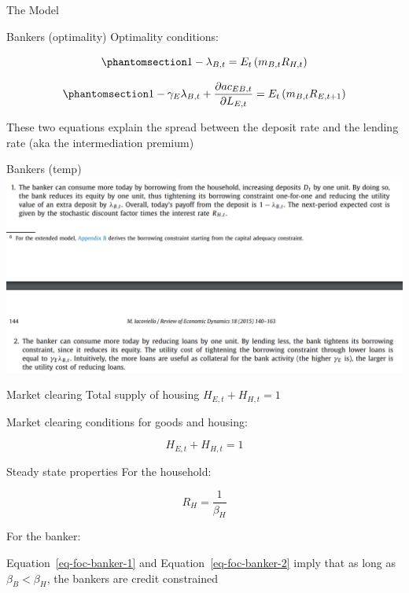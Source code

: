 \documentclass[
  ignorenonframetext,
]{beamer}
\begin{document}
\begin{frame}{The Model}
\begin{block}{Bankers (optimality)}
Optimality conditions:

\begin{equation}\phantomsection\label{eq-foc-banker-1}{1-\lambda_{B,t} = E_t \left( m_{B,t} R_{H,t} \right)}\end{equation}

\begin{equation}\phantomsection\label{eq-foc-banker-2}{1-\gamma_{E} \lambda_{B,t} + \frac{\partial ac_{EB,t}}{\partial L_{E,t}} = E_t \left( m_{B,t} R_{E,t+1} \right)}\end{equation}

These two equations explain the spread between the deposit rate and the
lending rate (aka the intermediation premium)
\end{block}

\begin{block}{Bankers (temp)}
\label{bankers-temp}
\includegraphics{assets/explanations.png}
\end{block}

\begin{block}{Market clearing}
\label{market-clearing}
Total supply of housing \(H_{E,t} + H_{H,t} = 1\)

Market clearing conditions for goods and housing:

\[H_{E,t} + H_{H,t} = 1\]
\end{block}

\begin{block}{Steady state properties}
\label{steady-state-properties}
For the household:

\[R_H=\frac{1}{\beta_H}\]

For the banker:

Equation~\ref{eq-foc-banker-1} and Equation~\ref{eq-foc-banker-2} imply
that as long as \(\beta_B<\beta_H\), the bankers are credit constrained


\end{block}
\end{frame}
\end{document}

